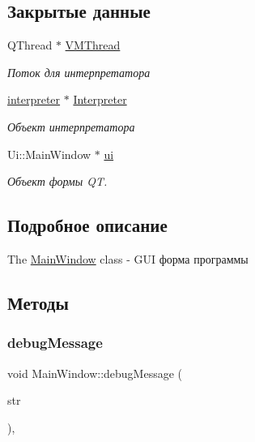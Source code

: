 \subsection*{Закрытые данные}
\begin{DoxyCompactItemize}
\item 
\hypertarget{class_main_window_aa16438ee9c972be8c7231f2d376dafb7}{}\label{class_main_window_aa16438ee9c972be8c7231f2d376dafb7} 
Q\+Thread $\ast$ \hyperlink{class_main_window_aa16438ee9c972be8c7231f2d376dafb7}{V\+M\+Thread}
\begin{DoxyCompactList}\small\item\em Поток для интерпретатора \end{DoxyCompactList}\item 
\hypertarget{class_main_window_ab42a1f6ee7d167221b9b5078b2ba38a7}{}\label{class_main_window_ab42a1f6ee7d167221b9b5078b2ba38a7} 
\hyperlink{classinterpreter}{interpreter} $\ast$ \hyperlink{class_main_window_ab42a1f6ee7d167221b9b5078b2ba38a7}{Interpreter}
\begin{DoxyCompactList}\small\item\em Объект интерпретатора \end{DoxyCompactList}\item 
\hypertarget{class_main_window_a35466a70ed47252a0191168126a352a5}{}\label{class_main_window_a35466a70ed47252a0191168126a352a5} 
Ui\+::\+Main\+Window $\ast$ \hyperlink{class_main_window_a35466a70ed47252a0191168126a352a5}{ui}
\begin{DoxyCompactList}\small\item\em Объект формы QT. \end{DoxyCompactList}\end{DoxyCompactItemize}


\subsection{Подробное описание}
The \hyperlink{class_main_window}{Main\+Window} class -\/ G\+UI форма программы 

\subsection{Методы}
\hypertarget{class_main_window_ac29732293ed85bb092764df7b93fefbc}{}\label{class_main_window_ac29732293ed85bb092764df7b93fefbc} 
\subsubsection{\texorpdfstring{debug\+Message}{debugMessage}}
{\footnotesize\ttfamily void Main\+Window\+::debug\+Message (\begin{DoxyParamCaption}\item[{Q\+String}]{str }\end{DoxyParamCaption})\hspace{0.3cm}{\ttfamily [private]}, {\ttfamily [slot]}}



